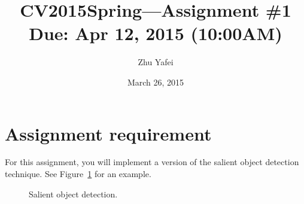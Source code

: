 \documentclass[12pt]{article}
\begin{document}
\title{\vspace{-2em}CV2015Spring---Assignment \#\textbf{1}\\
\normalsize{Due: Apr 12, 2015 (10:00AM)}}
\author{Zhu Yafei}
\date{\vspace{-0.7em}March 26, 2015\vspace{-0.7em}}
\maketitle\thispagestyle{fancy}
\maketitle


\section{Assignment requirement}

For this assignment, you will implement a version of the salient object detection technique. See Figure~\ref{fig: result} for an example.

\begin{figure}[!ht]
  \centering 
  \caption{Salient object detection.}
  \label{fig: result} %
\end{figure}
\end{document}
